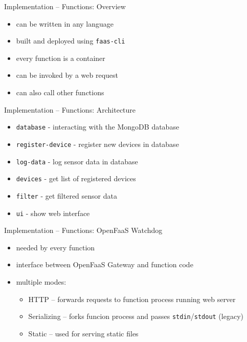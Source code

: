 \begin{frame}{Implementation -- Functions: Overview}
  \begin{itemize}
    \item can be written in any language
    \item built and deployed using \texttt{faas-cli}
    \item every function is a container
    \item can be invoked by a web request
    \item can also call other functions
  \end{itemize}
\end{frame}

\begin{frame}{Implementation -- Functions: Architecture}
  \begin{itemize}
    \item \texttt{database} - interacting with the MongoDB database
    \item \texttt{register-device} - register new devices in database
    \item \texttt{log-data} - log sensor data in database
    \item \texttt{devices} - get list of registered devices
    \item \texttt{filter} - get filtered sensor data
    \item \texttt{ui} - show web interface
  \end{itemize}
\end{frame}

\begin{frame}{Implementation -- Functions: OpenFaaS Watchdog}
  \begin{itemize}
    \item needed by every function
    \item interface between OpenFaaS Gateway and function code
    \item multiple modes:
      \begin{itemize}
        \item HTTP -- forwards requests to function process running web server
        \item Serializing -- forks funcion process and passes \texttt{stdin}/\texttt{stdout} (legacy)
        \item Static -- used for serving static files
      \end{itemize}
  \end{itemize}
\end{frame}

